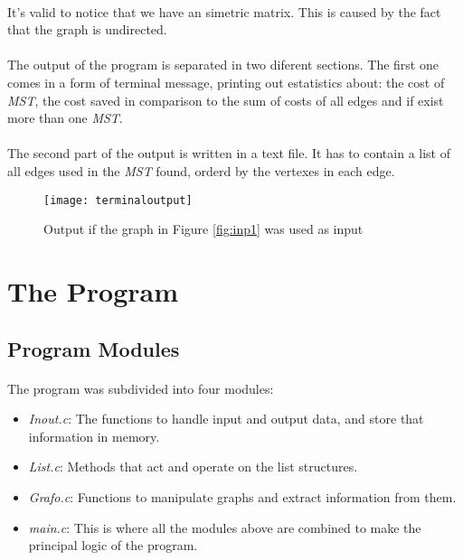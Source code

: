\documentclass[titlepage]{article}
\begin{document}
    \paragraph{}
        It's valid to notice that we have an simetric matrix. This is caused by the fact that the graph is undirected. 
    \paragraph{}
        The output of the program is separated in two diferent sections. The first one comes in a form of terminal message, printing out estatistics about: the cost of \emph{MST}, the cost saved in comparison to the sum of costs of all edges and if exist more than one \emph{MST}.
        \paragraph{}
        The second part of the output is written in a text file. It has to contain a list of all edges used in the \emph{MST} found, orderd by the vertexes in each edge.
        \begin{figure}[h]
            \begin{center}
                \texttt{[image: terminaloutput]}
                \caption{Output if the graph in Figure \ref{fig:inp1} was used as input}
            \end{center}
        \end{figure}
    \section{The Program}
        \subsection{Program Modules}
        \paragraph{}
        The program was subdivided into four modules: 
        \begin{itemize}
            \item \emph{Inout.c}: The functions to handle input and output data, and store that information in memory.
            \item \emph{List.c}: Methods that act and operate on the list structures.
            \item \emph{Grafo.c}: Functions to manipulate graphs and extract information from them.
            \item \emph{main.c}: This is where all the modules above are combined to make the principal logic of the program.
        \end{itemize}
\end{document}
